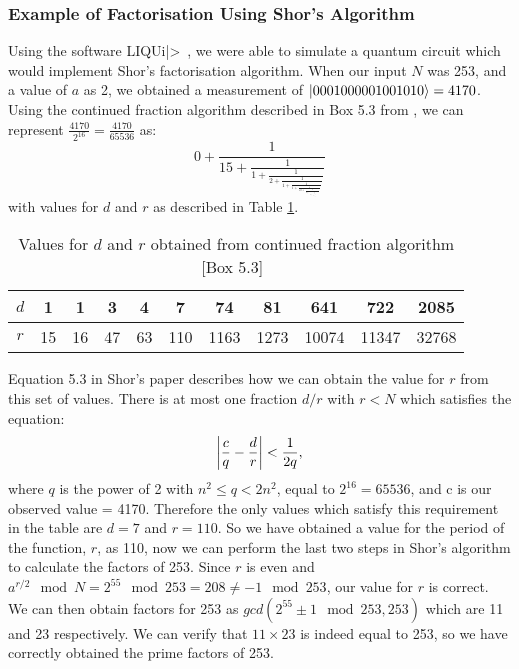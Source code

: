 \subsubsection{Example of Factorisation Using Shor's Algorithm}
Using the software {LIQU}i|>~\cite{1402.4467}, we were able to simulate a quantum circuit which would implement Shor's factorisation algorithm. When our input $N$ was 253, and a value of $a$ as 2, we obtained a measurement of $\ket{0001000001001010} = 4170$. Using the continued fraction algorithm described in Box 5.3 from \cite{nielsen2002quantum}, we can represent $\frac{4170}{2^{16}} = \frac{4170}{65536}$ as: $$0 + \frac{1}{15 + \frac{1}{1 + \frac{1}{2 + \frac{1}{1 + \frac{1}{1 + \frac{1}{10 + \frac{1}{1 + \frac{1}{7 + \frac{1}{1 + \frac{1}{2}}}}}}}}}}$$ with values for $d$ and $r$ as described in Table \ref{table:valuesdr}.
\begin{table}[!htb]
\centering
\begin{tabular}{|c|c|c|c|c|c|c|c|c|c|c|}
\hline
$d$ & 1  & 1  & 3  & 4  & 7   & 74   & 81   & 641   & 722   & 2085  \\ \hline
$r$ & 15 & 16 & 47 & 63 & 110 & 1163 & 1273 & 10074 & 11347 & 32768 \\ \hline
\end{tabular}
\caption{Values for $d$ and $r$ obtained from continued fraction algorithm [Box 5.3]~\cite{nielsen2002quantum}}
\label{table:valuesdr}
\end{table}
Equation 5.3 in Shor's paper describes how we can obtain the value for $r$ from this set of values. There is at most one fraction $d/r$ with $r < N$ which satisfies the equation: $$\abs*{\frac{c}{q} - \frac{d}{r}} < \frac{1}{2q},$$ where $q$ is the power of 2 with $n^2 \leq q < 2n^2$, equal to $2^{16} = 65536$, and c is our observed value = 4170. Therefore the only values which satisfy this requirement in the table are $d = 7$ and $r = 110$. So we have obtained a value for the period of the function, $r$, as 110, now we can perform the last two steps in Shor's algorithm to calculate the factors of 253. Since $r$ is even and $a^{r/2}\mod N = 2^{55}\mod 253 = 208 \neq -1\mod 253$, our value for $r$ is correct. We can then obtain factors for 253 as $gcd(2^{55}\pm 1\mod 253, 253)$ which are 11 and 23 respectively. We can verify that $11\times 23$ is indeed equal to 253, so we have correctly obtained the prime factors of 253.
